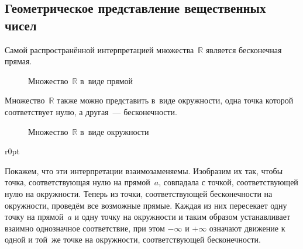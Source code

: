 \subsection{Геометрическое представление вещественных чисел}
Самой распространённой интерпретацией множества~$\mathbb R$ является бесконечная прямая.
\begin{figure}[H] \centering
\noindent
{}
\caption{Множество~$\mathbb R$ в~виде прямой}
\end{figure}

Множество~$\mathbb R$ также можно представить в~виде окружности, одна точка которой соответствует нулю, а другая~--- бесконечности.
\begin{figure}[H] \centering
\noindent
{}
\caption{Множество~$\mathbb R$ в~виде окружности}
\end{figure}

\begin{wrapfigure}{r}{0pt} %
\noindent
{}
\end{wrapfigure}
Покажем, что эти интерпретации взаимозаменяемы.
Изобразим их так, чтобы точка, соответствующая нулю на прямой~$a$, совпадала с точкой, соответствующей нулю на окружности.
Теперь из точки, соответствующей бесконечности на окружности, проведём все возможные прямые.
Каждая из них пересекает одну точку на прямой~$a$ и одну точку на окружности и таким образом устанавливает взаимно однозначное соответствие, при этом $-\infty$ и $+\infty$ означают движение к одной и той~же точке на окружности, соответствующей бесконечности.